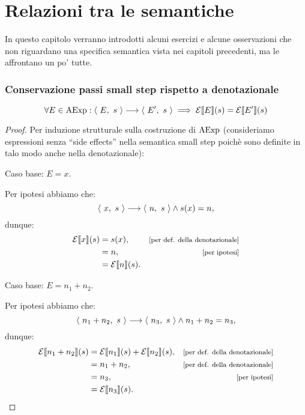 \chapter{Relazioni tra le semantiche}
In questo capitolo verranno introdotti alcuni esercizi e alcune osservazioni
che non riguardano una specifica semantica vista nei capitoli precedenti,
ma le affrontano un po' tutte.

\subsection{Conservazione passi small step rispetto a denotazionale}

\begin{proposizione}
\label{conservazione-passi-small-step-expr}
\[
  \forall E \in \mathrm{AExp} \mathrel{:} \langle\ E,\ s\ \rangle \longrightarrow \langle\ E',\ s\ \rangle 
  \implies \mathcal{E}\llbracket E \rrbracket(s) = \mathcal{E}\llbracket E' \rrbracket(s)
\]

\begin{proof}
Per induzione strutturale sulla costruzione di $\mathrm{AExp}$ (consideriamo
espressioni senza ``side effects'' nella semantica small step poichè sono
definite in talo modo anche nella denotazionale):

Caso base: $E = x$.

Per ipotesi abbiamo che:
\[
  \langle\ x,\ s\ \rangle \longrightarrow \langle\ n,\ s\ \rangle \land s(x) = n,
\]
dunque:
\begin{align*}
  \calE\llbracket x \rrbracket(s) &= s(x),
    &\law{per def. della denotazionale} \\
  &= n,
    &\law{per ipotesi} \\
  &= \calE\llbracket n \rrbracket(s).
\end{align*}

Caso base: $E = n_1 + n_2$.

Per ipotesi abbiamo che:
\[
  \langle\ n_1 + n_2,\ s\ \rangle \longrightarrow \langle\ n_3,\ s\ \rangle \land n_1 + n_2 = n_3,
\]
dunque:
\begin{align*}
  \calE\llbracket n_1 + n_2 \rrbracket(s) 
  &= \calE\llbracket n_1 \rrbracket(s) 
  + \calE\llbracket n_2 \rrbracket(s),
    &\law{per def. della denotazionale} \\
  &= n_1 + n_2,
    &\law{per def. della denotazionale} \\
  &= n_3,
    &\law{per ipotesi} \\
  &= \calE\llbracket n_3 \rrbracket(s).
\end{align*}


\end{proof}
\end{proposizione}
